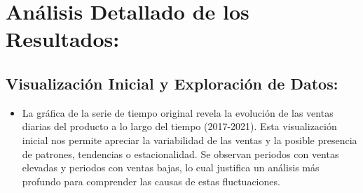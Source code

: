 \documentclass[
]{book}
\providecommand{\tightlist}{%
  \setlength{\itemsep}{0pt}\setlength{\parskip}{0pt}}
\begin{document}
\section{Análisis Detallado de los Resultados:}\label{anuxe1lisis-detallado-de-los-resultados}

\subsection{Visualización Inicial y Exploración de Datos:}\label{visualizaciuxf3n-inicial-y-exploraciuxf3n-de-datos}

\begin{itemize}
\tightlist
\item
  La gráfica de la serie de tiempo original revela la evolución de las ventas diarias del producto a lo largo del tiempo (2017-2021). Esta visualización inicial nos permite apreciar la variabilidad de las ventas y la posible presencia de patrones, tendencias o estacionalidad. Se observan periodos con ventas elevadas y periodos con ventas bajas, lo cual justifica un análisis más profundo para comprender las causas de estas fluctuaciones.
\end{itemize}
\end{document}
